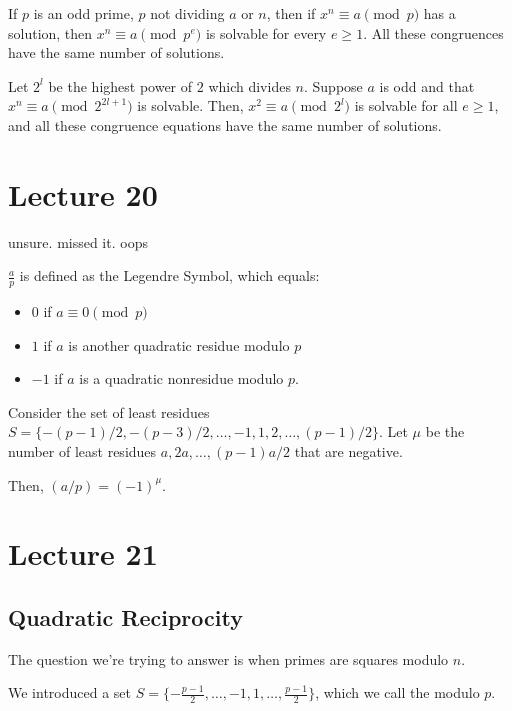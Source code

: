 \documentclass{article}
\begin{document}
\begin{lemma}
    If $p$ is an odd prime, $p$ not dividing $a$ or $n$, then if $x^n \equiv a \pmod p$ has a solution, then $x^n \equiv a \pmod{p^e}$ is solvable for every $e \geq 1$. All these congruences have the same number of solutions.
\end{lemma}

\begin{lemma}
    Let $2^l$ be the highest power of $2$ which divides $n$. Suppose $a$ is odd and that $x^n \equiv a \pmod{2^{2l + 1}}$ is solvable. Then, $x^2 \equiv a \pmod{2^l}$ is solvable for all $e \geq 1$, and all these congruence equations have the same number of solutions.
\end{lemma}

\section{Lecture 20}
unsure. missed it. oops

\begin{definition} 
	$\frac{a}{p}$ is defined as the Legendre Symbol, which equals:
	\begin{itemize}
		\item $0$ if $a \equiv 0 \pmod p$
		\item $1$ if $a$ is another quadratic residue modulo $p$
		\item $-1$ if $a$ is a quadratic nonresidue modulo $p$.
	\end{itemize}
\end{definition}

\begin{lemma} 
	Consider the set of least residues $S = \{ -(p-1)/2, -(p-3)/2, \ldots, -1, 1, 2, \ldots, (p-1)/2 \}$. Let $\mu$ be the number of least residues $a, 2a, \ldots, (p-1)a/2$ that are negative.

	Then, $(a / p) = (-1)^{\mu}$. 
\end{lemma}

\section{Lecture 21}
\subsection{Quadratic Reciprocity}
The question we're trying to answer is when primes are squares modulo $n$.

We introduced a set $S = \{-\frac{p-1}{2}, \ldots, -1, 1, \ldots, \frac{p-1}{2}\}$, which we call the  modulo $p$.
\end{document}
